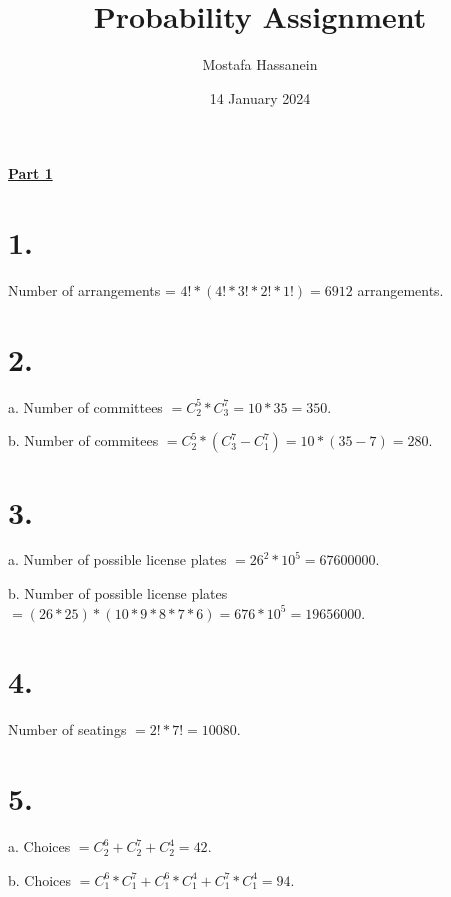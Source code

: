 \documentclass{article}
\author{Mostafa Hassanein}
\title{Probability Assignment}
\date{14 January 2024}
\begin{document}
\maketitle

\newpage

\newcommand*\numcircledmod[1]{\raisebox{.5pt}{\textcircled{\raisebox{-.9pt} {#1}}}}

\newcommand*\numcircledtikz[1]{\tikz[baseline=(char.base)]{
            \node[shape=circle,draw,inner sep=1.2pt] (char) {#1};}} 

\begin{center}
  \textbf{\underline{Part 1}}
\end{center}

\section*{1.}

Number of arrangements = $4!*(4!*3!*2!*1!) = 6912$ arrangements.

\section*{2.}

a. Number of committees $= C^5_2 * C^7_3 = 10 * 35 = 350$.

\noindent
b. Number of commitees $= C^5_2 * (C^7_3 - C^7_1) = 10 * (35 - 7) = 280$.

\section*{3.}
a. Number of possible license plates $= 26^2*10^5 = 67600000$.

\noindent
b. Number of possible license plates $= (26*25)*(10*9*8*7*6) = 676 * 10^5 = 19656000$.

\section*{4.}

Number of seatings $= 2!*7! = 10080$.

\section*{5.}

a. Choices $= C^6_2 + C^7_2 + C^4_2 = 42$.

\noindent
b. Choices $= C^6_1 * C^7_1 + C^6_1 * C^4_1 + C^7_1 * C^4_1 = 94$.
\end{document}

